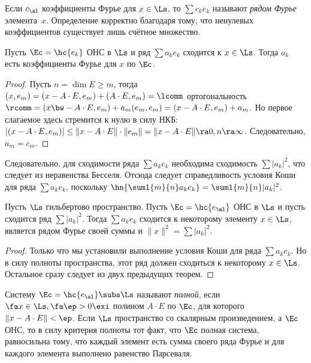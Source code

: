 \documentclass[a4paper]{article}
\begin{document}
Если $c_\al$ коэффициенты Фурье для $x \in \Ls$, то $\sum c_k e_k$ называют \emph{рядом Фурье}
элемента~$x$. Определение корректно благодаря тому, что ненулевых коэффициентов
существует лишь счётное множество.

\begin{theorem}
Пусть $\Ec = \hc{e_k}$ ОНС в $\Ls$ и ряд $\sum a_k e_k$ сходится к $x \in \Ls$. Тогда
$a_k$ есть коэффициенты Фурье для $x$ по $\Ec$.
\end{theorem}
\begin{proof}
Пусть $n = \dim E \ge m$, тогда $(x, e_m) = (x-A\cdot E, e_m) + (A\cdot E, e_m) = \lcomm$
ортогональность $\rcomm = (x \bw- A\cdot E, e_m) + a_m(e_m,e_m) = (x - A \cdot E, e_m) + a_m$.
Но первое слагаемое здесь стремится к нулю в силу НКБ:
$|(x - A\cdot E, e_m)| \le \|x - A\cdot E\| \cdot \|e_m\| = \|x - A\cdot E\| \ra 0, n \ra \infty$.
Следовательно, $a_m = c_m$.
\end{proof}

Следовательно, для сходимости ряда $\sum a_k e_k$ необходима сходимость $\sum |a_k|^2$, что
следует из неравенства Бесселя. Отсюда следует справедливость условия Коши для ряда $\sum a_ke_k$,
поскольку $\hn{\suml{m}{n} a_k e_k} = \suml{m}{n} |a_k|^2$.

\begin{theorem}
Пусть $\Ls$ гильбертово пространство. Пусть $\Ec = \hc{e_\al}$ ОНС в $\Ls$ и пусть сходится ряд
$\sum |a_k|^2$. Тогда $\sum a_k e_k$ сходится к некоторому элементу $x \in \Ls$, является
рядом Фурье своей суммы и $\|x\|^2 = \sum |a_k|^2$.
\end{theorem}
\begin{proof}
Только что мы установили выполнение условия Коши для ряда $\sum a_k e_k$. Но в силу полноты
пространства, этот ряд должен сходиться к некоторому $x \in \Ls$.
Остальное сразу следует из двух предыдущих теорем.
\end{proof}

Систему $\Ec = \hc{e_\al} \subs \Ls$ называют \emph{полной}, если $\fa x \in \Ls, \fa \ep > 0 \exi$
полином $A \cdot E$ по $\Ec$, для
которого $\|x - A \cdot E \| < \ep$.
Если $\Ls$ пространство со скалярным произведением, а $\Ec$ ОНС, то в силу критерия полноты тот
факт, что $\Ec$ полная система, равносильна тому, что каждый элемент есть сумма своего ряда
Фурье и для каждого элемента выполнено равенство Парсеваля.
\end{document}
